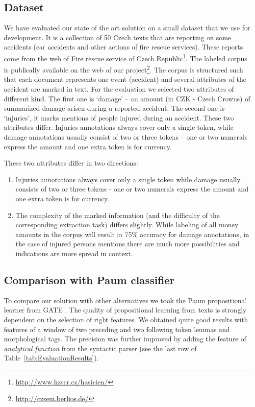 \subsection{Dataset}
We have evaluated our state of the art solution on a small dataset that we use for development. It is a collection of 50 Czech texts that are reporting on some accidents (car accidents and other actions of fire rescue services). These reports come from the web of Fire rescue service of Czech Republic\footnote{\url{http://www.hzscr.cz/hasicien/}}. The labeled corpus is publically available on the web of our project\footnote{\url{http://czsem.berlios.de/}}.
The corpus is structured such that each document represents one event (accident) and several attributes of the accident are marked in text. For the evaluation we selected two attributes of different kind. The first one is `damage' -- an amount (in CZK - Czech Crowns) of summarized damage arisen during a reported accident. The second one is `injuries', it marks mentions of people injured during an accident. These two attributes differ. Injuries annotations always cover only a single token, while damage annotations usually consist of two or three tokens -- one or two numerals express the amount and one extra token is for currency.

These two attributes differ in two directions:
\begin{enumerate}
	\item Injuries annotations always cover only a single token while damage usually consists of two or three tokens - one or two numerals express the amount and one extra token is for currency.
	\item The complexity of the marked information (and the difficulty of the corresponding extraction task) differs slightly. While labeling of all money amounts in the corpus will result in 75\% accuracy for damage annotations, in the case of injured persons mentions there are much more possibilities and indications are more spread in context.
\end{enumerate}

\subsection{Comparison with Paum classifier}
To compare our solution with other alternatives we took the Paum propositional learner from GATE \citep{Li:Paum}. The quality of propositional learning from texts is strongly dependent on the selection of right features. We obtained quite good results with features of a window of two preceding and two following token lemmas and morphological tags. The precision was further improved by adding the feature of \emph{analytical function} from the syntactic parser (see the last row of Table~\ref{tab:EvaluationResults}).

